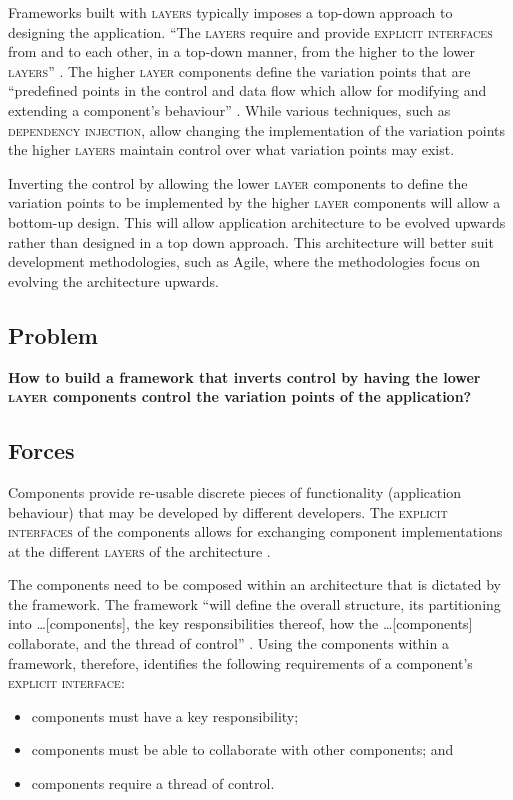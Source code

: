 \documentclass[prodmode]{style/acmlarge}
\begin{document}
Frameworks built with \textsc{layers} typically imposes a top-down approach to
designing the application.  ``The \textsc{layers} require and provide
\textsc{explicit interfaces} from and to each other, in a top-down manner, from
the higher to the lower \textsc{layers}'' \cite[p. 11]{ioc}.  The higher
\textsc{layer} components define the variation points that are ``predefined
points in the control and data flow which allow for modifying and extending a
component's behaviour'' \cite[p. 5]{ioc}.  While various techniques, such as
\textsc{dependency injection}, allow changing the implementation of the
variation points the higher \textsc{layers} maintain control over what variation
points may exist.

Inverting the control by allowing the lower \textsc{layer} components to define
the variation points to be implemented by the higher \textsc{layer} components
will allow a bottom-up design.  This will allow application architecture to be
evolved upwards rather than designed in a top down approach.  This architecture
will better suit development methodologies, such as Agile, where the
methodologies focus on evolving the architecture upwards.


\subsection{Problem}

\textbf{How to build a framework that inverts control by having the lower
\textsc{layer} components control the variation points of the application?}


\subsection{Forces}

Components provide re-usable discrete pieces of functionality (application
behaviour) that may be developed by different developers.  The \textsc{explicit
interfaces} of the components allows for exchanging component implementations at
the different \textsc{layers} of the architecture \cite{ioc}.

The components need to be composed within an architecture that is dictated by
the framework.  The framework ``will define the overall structure, its
partitioning into \ldots [components], the key responsibilities thereof, how the
\ldots [components] collaborate, and the thread of control'' \cite[p.26]{gof}.
Using the components within a framework, therefore, identifies the following
requirements of a component's \textsc{explicit interface}:
\begin{itemize}
  \item components must have a key responsibility;
  \item components must be able to collaborate with other components; and
  \item components require a thread of control.
\end{itemize}
\end{document}
